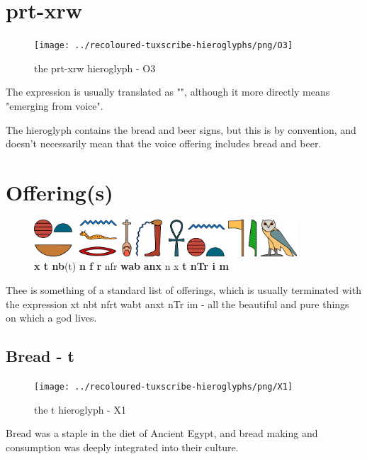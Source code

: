 \section*{prt-xrw}

\begin{figure} [H]
	\centering
	\texttt{[image: ../recoloured-tuxscribe-hieroglyphs/png/O3]}
	\caption{the prt-xrw hieroglyph - O3}
\end{figure}

The expression  is usually translated as "", although it more directly means "emerging from voice".

The hieroglyph contains the bread and beer signs, but this is by convention, and doesn't necessarily mean that the voice offering includes bread and beer.

\section*{Offering(s)}

\begin{figure} [H]
	\centering
	\includegraphics[width=0.875\textwidth]{../images/xt-nb-nfr-wab-anxt-ntr-im}
	\caption{\textbf{x t nb}(t) \textbf{n f r} nfr \textbf{wab} \textbf{anx} n x \textbf{t nTr i m}}
\end{figure}

Thee is something of a standard list of offerings, which is usually terminated with the expression xt nbt nfrt wabt anxt nTr im - all the beautiful and pure things on which a god lives.

\subsection*{Bread - t}

\begin{figure} [H]
	\centering
	\texttt{[image: ../recoloured-tuxscribe-hieroglyphs/png/X1]}
	\caption{the t hieroglyph - X1}
\end{figure}

Bread was a staple in the diet of Ancient Egypt, and bread making and consumption was deeply integrated into their culture.

